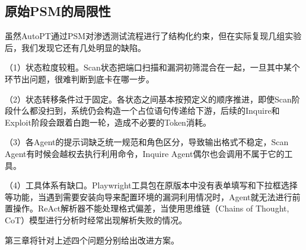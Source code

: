 \subsection{原始PSM的局限性}

虽然AutoPT通过PSM对渗透测试流程进行了结构化约束，但在实际复现几组实验后，我们发现它还有几处明显的缺陷。

（1）状态粒度较粗。Scan状态把端口扫描和漏洞初筛混合在一起，一旦其中某个环节出问题，很难判断到底卡在哪一步。

（2）状态转移条件过于固定。各状态之间基本按预定义的顺序推进，即使Scan阶段什么都没扫到，系统仍会构造一个占位语句传递给下游，后续的Inquire和Exploit阶段会跟着白跑一轮，造成不必要的Token消耗。

（3）各Agent的提示词缺乏统一规范和角色区分，导致输出格式不稳定，Scan Agent有时候会越权去执行利用命令，Inquire Agent偶尔也会调用不属于它的工具。

（4）工具体系有缺口。Playwright工具包在原版本中没有表单填写和下拉框选择等功能，当遇到需要安装向导来配置环境的漏洞利用情况时，Agent就无法进行前置操作。ReAct解析器不能处理格式偏差，当使用思维链（Chains of Thought, CoT）模型进行分析时经常出现解析失败的情况。

第三章将针对上述四个问题分别给出改进方案。

